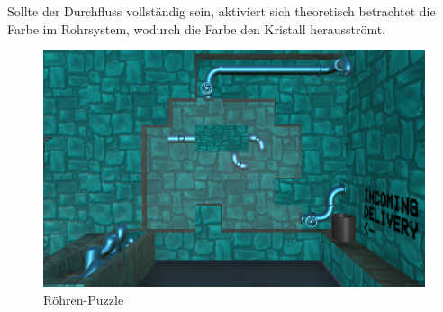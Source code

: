 Sollte der Durchfluss vollständig sein, aktiviert sich theoretisch betrachtet die Farbe im Rohrsystem, wodurch die Farbe den Kristall herausströmt.
\begin{figure}[h]
	\centering
	\includegraphics[width=\textwidth/2]{Pictures/Roehren}
	\caption{Röhren-Puzzle}
	\label{fig:cyan}
\end{figure}\\
